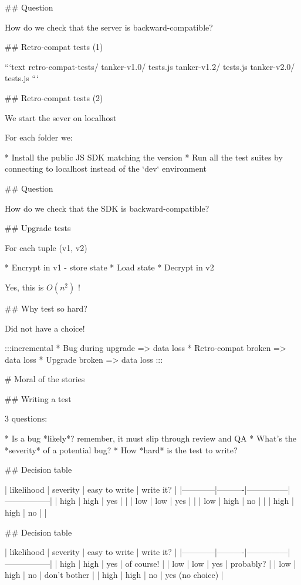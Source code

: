 ## Question

How do we check that the server is backward-compatible?

## Retro-compat tests (1)


```text
retro-compat-tests/
   tanker-v1.0/
     tests.js
   tanker-v1.2/
     tests.js
   tanker-v2.0/
     tests.js
 ```

## Retro-compat tests (2)

We start the sever on localhost

 For each folder we:

 * Install the public JS SDK matching the version
 * Run all the test suites by connecting to localhost
   instead of the `dev` environment

## Question

How do we check that the SDK is backward-compatible?

## Upgrade tests

For each tuple (v1, v2)

* Encrypt in v1 - store state
* Load state
* Decrypt in v2

\vfill

Yes, this is $O(n^2)$ !

## Why test so hard?

Did not have a choice!

:::incremental
* Bug during upgrade => data loss
* Retro-compat broken => data loss
* Upgrade broken => data loss
:::

# Moral of the stories


## Writing a test

3 questions:

* Is a bug *likely*? remember, it must slip through review and QA
* What's the *severity* of a potential bug?
* How *hard* is the test to write?

## Decision table


| likelihood | severity | easy to write | write it?       |
|------------|----------|---------------|-----------------|
| high       | high     | yes           |                 |
| low        | low      | yes           |                 |
| low        | high     | no            |                 |
| high       | high     | no            |                 |

## Decision table


| likelihood | severity | easy to write | write it?       |
|------------|----------|---------------|-----------------|
| high       | high     | yes           | of course!      |
| low        | low      | yes           | probably?       |
| low        | high     | no            | don't bother    |
| high       | high     | no            | yes (no choice) |

